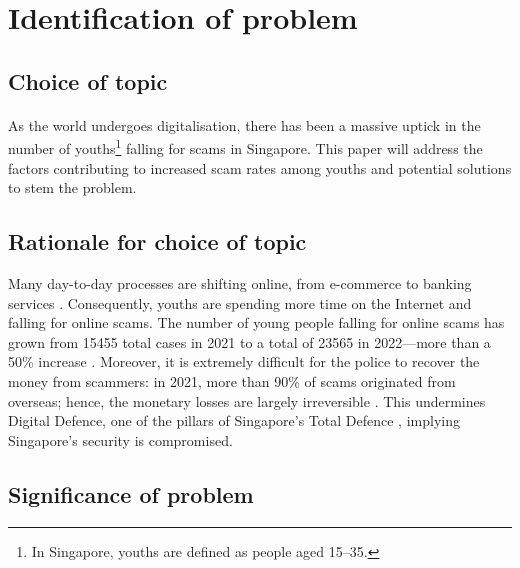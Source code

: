 \documentclass[a4paper]{article}
\begin{document}
\newpage


\begin{abstract}
  \noindent
  \ldots?
\end{abstract}

\newpage


\tableofcontents

\newpage


\section{Identification of problem}
\subsection{Choice of topic}
\paragraph{} As the world undergoes digitalisation, there has been a massive
uptick in the number of youths\footnote{In Singapore, youths are defined as
  people aged 15--35.} falling for scams in Singapore. This paper will address
the factors contributing to increased scam rates among youths and potential
solutions to stem the problem.

\subsection{Rationale for choice of topic}
Many day-to-day processes are shifting online, from e-commerce
\parencite{ITA.2022} to banking services \parencite{Degenhard.2023}.
Consequently, youths are spending more time on the Internet and falling for
online scams. The number of young people falling for online scams has grown from
15455 total cases in 2021 to a total of 23565 in 2022---more than a 50\% increase
\parencite{Tham.2023}. Moreover, it is extremely difficult for the police to
recover the money from scammers: in 2021, more than 90\% of scams originated
from overseas; hence, the monetary losses are largely irreversible
\parencite{Begum.2022}. This undermines Digital Defence, one of the pillars of
Singapore’s Total Defence \parencite{SCDF.2023}, implying Singapore’s security
is compromised.

\subsection{Significance of problem}
\end{document}
